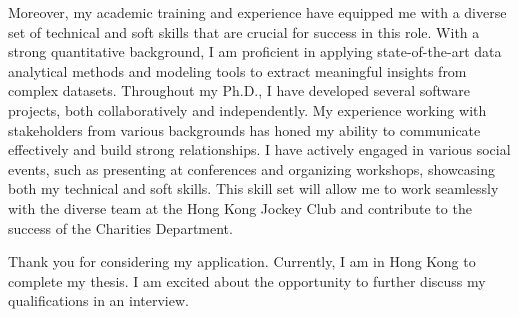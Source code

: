 \documentclass[11pt, a4paper]{awesome-cv}
\begin{document}
\begin{cvletter}
Moreover, my academic training and experience have equipped me with a diverse set of technical and soft skills that are crucial for success in this role. With a strong quantitative background, I am proficient in applying state-of-the-art data analytical methods and modeling tools to extract meaningful insights from complex datasets. Throughout my Ph.D., I have developed several software projects, both collaboratively and independently. My experience working with stakeholders from various backgrounds has honed my ability to communicate effectively and build strong relationships. I have actively engaged in various social events, such as presenting at conferences and organizing workshops, showcasing both my technical and soft skills. This skill set will allow me to work seamlessly with the diverse team at the Hong Kong Jockey Club and contribute to the success of the Charities Department.

Thank you for considering my application. Currently, I am in Hong Kong to complete my thesis. I am excited about the opportunity to further discuss my qualifications in an interview.


\end{cvletter}


\makeletterclosing
\end{document}
